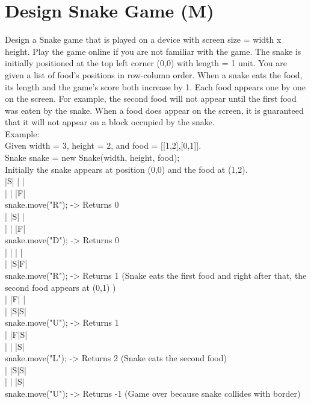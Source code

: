 \section{Design Snake Game (M)}
Design a Snake game that is played on a device with screen size = width x height. Play the game online if you are not familiar with the game. The snake is initially positioned at the top left corner (0,0) with length = 1 unit. You are given a list of food's positions in row-column order. When a snake eats the food, its length and the game's score both increase by 1. Each food appears one by one on the screen. For example, the second food will not appear until the first food was eaten by the snake. When a food does appear on the screen, it is guaranteed that it will not appear on a block occupied by the snake.\\

Example:\\
Given width = 3, height = 2, and food = [[1,2],[0,1]].\\
Snake snake = new Snake(width, height, food);\\

Initially the snake appears at position (0,0) and the food at (1,2).\\
|S| | |\\
| | |F|\\

snake.move("R"); -> Returns 0\\
| |S| |\\
| | |F|\\

snake.move("D"); -> Returns 0\\
| | | |\\
| |S|F|\\

snake.move("R"); -> Returns 1 (Snake eats the first food and right after that, the second food appears at (0,1) )\\
| |F| |\\
| |S|S|\\

snake.move("U"); -> Returns 1\\
| |F|S|\\
| | |S|\\

snake.move("L"); -> Returns 2 (Snake eats the second food)\\
| |S|S|\\
| | |S|\\

snake.move("U"); -> Returns -1 (Game over because snake collides with border)\\

